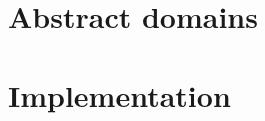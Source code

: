 \documentclass{kththesis}
\begin{document}


\section{Abstract domains}

\section{Implementation}


\end{document}
